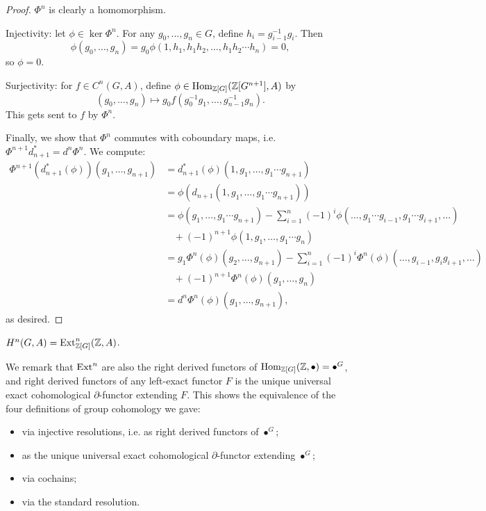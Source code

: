 \documentclass[11pt]{amsart}
\begin{document}
\begin{proof}
    $\Phi^n$ is clearly a homomorphism. 
    
    Injectivity: let $\phi\in \ker \Phi^n$. For any $g_0,\dots,g_n\in G$, define $h_i = g_{i-1}^{-1}g_i$. Then
    \[\phi(g_0,\dots,g_n) = g_0\phi(1, h_1, h_1h_2,\dots,h_1h_2\cdots h_n) = 0,\]
    so $\phi = 0$.

    Surjectivity: for $f\in C^n(G,A)$, define $\phi\in \operatorname{Hom}_{\mathbb{Z}[G]}(\mathbb{Z}[G^{n+1}], A)$ by
    \[(g_0,\dots,g_n) \mapsto g_0f(g_0^{-1}g_1,\dots, g_{n-1}^{-1}g_n).\]
    This gets sent to $f$ by $\Phi^n$.

    Finally, we show that $\Phi^n$ commutes with coboundary maps, i.e. $\Phi^{n+1}d_{n+1}^\ast = d^n\Phi^n$. We compute:
    \begin{align*}
        \Phi^{n+1}(d_{n+1}^\ast(\phi))(g_1,\dots,g_{n+1})
        &= d_{n+1}^\ast(\phi)(1,g_1,\dots,g_1\cdots g_{n+1}) \\
        &= \phi(d_{n+1}(1,g_1,\dots,g_1\cdots g_{n+1}))\\
        &= \phi(g_1,\dots,g_1\cdots g_{n+1}) - \sum_{i=1}^n (-1)^i \phi(\dots,g_1\cdots g_{i-1}, g_1\cdots g_{i+1},\dots) \\
        &\ \ \ \ + (-1)^{n+1}\phi(1,g_1,\dots, g_1\cdots g_n) \\
        &= g_1\Phi^n(\phi)(g_2,\dots,g_{n+1}) - \sum_{i=1}^n (-1)^i \Phi^n(\phi)(\dots,g_{i-1},g_ig_{i+1},\dots) \\
        &\ \ \ \ + (-1)^{n+1}\Phi^n(\phi)(g_1,\dots, g_n) \\
        &= d^n\Phi^n(\phi)(g_1,\dots,g_{n+1}),
    \end{align*}
    as desired.
\end{proof}

\begin{cor}
    $H^n(G,A) = \operatorname{Ext}_{\mathbb{Z}[G]}^n(\mathbb{Z},A)$.
\end{cor}

We remark that $\operatorname{Ext}^n$ are also the right derived functors of $\operatorname{Hom}_{\mathbb{Z}[G]}(\mathbb{Z},\bullet) = \bullet^G$, and right derived functors of any left-exact functor $F$ is the unique universal exact cohomological $\partial$-functor extending $F$. This shows the equivalence of the four definitions of group cohomology we gave:
\begin{itemize}
    \item via injective resolutions, i.e. as right derived functors of $\bullet^G$;
    \item as the unique universal exact cohomological $\partial$-functor extending $\bullet^G$;
    \item via cochains;
    \item via the standard resolution.
\end{itemize}
\end{document}
